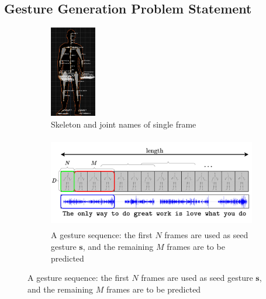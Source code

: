 

\subsection{Gesture Generation Problem Statement}
\label{sec:Data}

\begin{figure}[h]
	\centering
	\begin{subfigure}{0.2\linewidth}
		\centering
		\includegraphics[height=4cm]{figures/Skeleton.png}
		\caption{\small Skeleton and joint names of single frame}
		\label{fig:Skeleton}
	\end{subfigure}
	\hfill
	\begin{subfigure}{0.75\linewidth}
			\centering
			\includegraphics[height=4cm]{figures/FeatureProcessing}
			\caption{A gesture sequence: the first $N$ frames are used as seed gesture $\mathbf{s}$, and the remaining $M$ frames are to be predicted}
			\label{fig:GestureSeries}
	\end{subfigure}
\end{figure}


